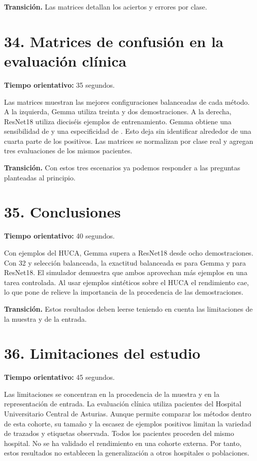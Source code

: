 \documentclass[11pt,a4paper]{article}
\begin{document}
\textbf{Transición.} Las matrices detallan los aciertos y errores por clase.

\section*{34. Matrices de confusión en la evaluación clínica}
\textbf{Tiempo orientativo: }35 segundos.

Las matrices muestran las mejores configuraciones balanceadas de cada método. A la izquierda, Gemma utiliza treinta y dos demostraciones. A la derecha, ResNet18 utiliza dieciséis ejemplos de entrenamiento. Gemma obtiene una sensibilidad de \RealVlmSens{} y una especificidad de \RealVlmSpec{}. Esto deja sin identificar alrededor de una cuarta parte de los positivos. Las matrices se normalizan por clase real y agregan tres evaluaciones de los mismos pacientes.

\textbf{Transición.} Con estos tres escenarios ya podemos responder a las preguntas planteadas al principio.

\section*{35. Conclusiones}
\textbf{Tiempo orientativo: }40 segundos.

Con ejemplos del HUCA, Gemma supera a ResNet18 desde ocho demostraciones. Con 32 y selección balanceada, la exactitud balanceada es \RealVlmBA{} para Gemma y \RealCnnLastBA{} para ResNet18. El simulador demuestra que ambos aprovechan más ejemplos en una tarea controlada. Al usar ejemplos sintéticos sobre el HUCA el rendimiento cae, lo que pone de relieve la importancia de la procedencia de las demostraciones.

\textbf{Transición.} Estos resultados deben leerse teniendo en cuenta las limitaciones de la muestra y de la entrada.

\section*{36. Limitaciones del estudio}
\textbf{Tiempo orientativo: }45 segundos.

Las limitaciones se concentran en la procedencia de la muestra y en la representación de entrada. La evaluación clínica utiliza \HucaPatients{} pacientes del Hospital Universitario Central de Asturias. Aunque permite comparar los métodos dentro de esta cohorte, su tamaño y la escasez de ejemplos positivos limitan la variedad de trazados y etiquetas observada. Todos los pacientes proceden del mismo hospital. No se ha validado el rendimiento en una cohorte externa. Por tanto, estos resultados no establecen la generalización a otros hospitales o poblaciones.
\end{document}
